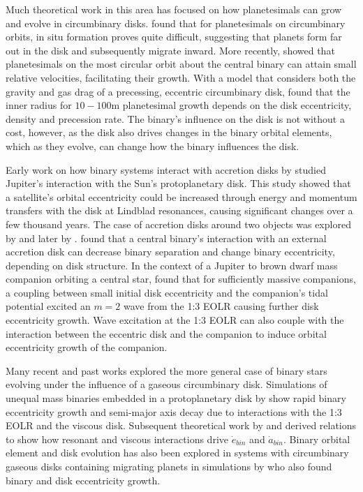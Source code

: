 Much theoretical work in this area has focused on how planetesimals
can grow and evolve in circumbinary disks.  \citet{Paardekooper2012}
found that for planetesimals on circumbinary orbits, in situ formation
proves quite difficult, suggesting that planets form far out in the
disk and subsequently migrate inward.  More recently, \citet{Bromley2015}
showed that planetesimals on the most circular orbit about the central
binary can attain small relative velocities, facilitating their growth.
With a model that considers both the gravity and gas drag of a
precessing, eccentric circumbinary disk, \citet{Silsbee2015a} found that
the inner radius for $10-100$m planetesimal growth depends on the disk eccentricity, density and precession rate.  The binary's influence on the disk is not without a cost, however, as the disk also drives changes in the binary orbital elements, which as they evolve, can change how the binary influences the disk.

Early work on how binary systems interact with accretion disks by \citet{Goldreich1980} studied Jupiter's interaction with the Sun's protoplanetary disk.  This study showed that a satellite's orbital eccentricity could be increased through energy and momentum transfers with the disk at Lindblad resonances, causing significant changes over a few thousand years.  The case of accretion disks around two objects was explored by \citet{Pringle1991} and later by \citet{Papaloizou2001}.  \citet{Pringle1991} found that a central binary's interaction with an external accretion disk can decrease binary separation and change binary eccentricity, depending on disk structure.  In the context of a Jupiter to brown dwarf mass companion orbiting a central star,  \citet{Papaloizou2001} found that for sufficiently massive companions, a coupling between small initial disk eccentricity and the companion's
tidal potential excited an $m = 2$ wave from the 1:3 EOLR causing further disk eccentricity growth.  Wave excitation at the 1:3 EOLR can also couple with the interaction between the eccentric disk and the companion to induce orbital eccentricity growth of the companion.  

Many recent and past works explored the more general case of binary stars evolving under the influence of a gaseous circumbinary disk.  Simulations of unequal mass binaries embedded in a protoplanetary disk by \citet{Artymowicz1991} show rapid binary eccentricity growth and semi-major axis decay due to interactions with the 1:3 EOLR and the viscous disk.  Subsequent theoretical work by \citet{Artymowicz1996b} and \citet{Artymowicz2000} derived relations to show how resonant and viscous interactions drive $\dot{e}_{bin}$ and $\dot{a}_{bin}$.  Binary orbital element and disk evolution has also been explored in systems with circumbinary gaseous disks containing migrating planets in simulations by \citet{Pierens2007} who also found binary and disk eccentricity growth.


